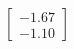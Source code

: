 \documentclass[preview]{standalone}
\begin{document}
\begin{align*}
\begin{bmatrix} -1.67 \\ -1.10 \end{bmatrix}
\end{align*}
\end{document}
